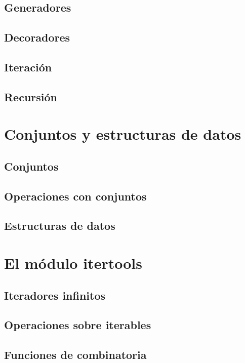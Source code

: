 \documentclass{article}
\begin{document}
\subsection{Generadores}

\subsection{Decoradores}

\subsection{Iteración}

\subsection{Recursión}

\section{Conjuntos y estructuras de datos}

\subsection{Conjuntos}

\subsection{Operaciones con conjuntos}

\subsection{Estructuras de datos}

\section{El módulo itertools}

\subsection{Iteradores infinitos}

\subsection{Operaciones sobre iterables}

\subsection{Funciones de combinatoria}
\end{document}
